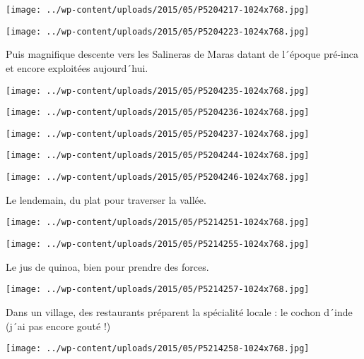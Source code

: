 \centerline{\texttt{[image: ../wp-content/uploads/2015/05/P5204217-1024x768.jpg]} } 
 \newline
 \newline
\centerline{\texttt{[image: ../wp-content/uploads/2015/05/P5204223-1024x768.jpg]} } 
 \newline
 Puis magnifique descente vers les Salineras de Maras datant de l´époque pré-inca et encore exploitées aujourd´hui. \newline
 \newline
\centerline{\texttt{[image: ../wp-content/uploads/2015/05/P5204235-1024x768.jpg]} } 
 \newline
 \newline
\centerline{\texttt{[image: ../wp-content/uploads/2015/05/P5204236-1024x768.jpg]} } 
 \newline
 \newline
\centerline{\texttt{[image: ../wp-content/uploads/2015/05/P5204237-1024x768.jpg]} } 
 \newline
 \newline
\centerline{\texttt{[image: ../wp-content/uploads/2015/05/P5204244-1024x768.jpg]} } 
 \newline
 \newline
\centerline{\texttt{[image: ../wp-content/uploads/2015/05/P5204246-1024x768.jpg]} } 
 \newline
 Le lendemain, du plat pour traverser la vallée. \newline
 \newline
\centerline{\texttt{[image: ../wp-content/uploads/2015/05/P5214251-1024x768.jpg]} } 
 \newline
 \newline
\centerline{\texttt{[image: ../wp-content/uploads/2015/05/P5214255-1024x768.jpg]} } 
 \newline
 Le jus de quinoa, bien pour prendre des forces. \newline
 \newline
\centerline{\texttt{[image: ../wp-content/uploads/2015/05/P5214257-1024x768.jpg]} } 
 \newline
 Dans un village, des restaurants préparent la spécialité locale : le cochon d´inde (j´ai pas encore gouté !) \newline
 \newline
\centerline{\texttt{[image: ../wp-content/uploads/2015/05/P5214258-1024x768.jpg]} } 
 \newline
